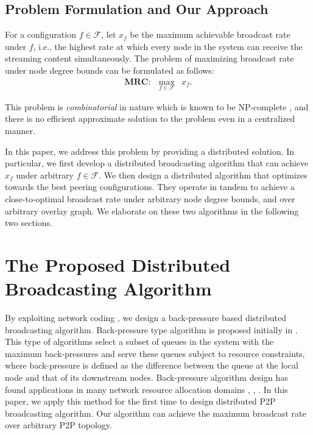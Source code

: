 \documentclass[10pt,conference]{IEEEtran}
\begin{document}
\subsection{Problem Formulation and Our Approach}

For a configuration $f\in\mathcal{F}$, let $x_{f}$
be the maximum achievable broadcast rate under $f$, i.e., the highest rate at which
every node in the system can receive the streaming content simultaneously. The problem of
maximizing broadcast rate under node degree bounds can be
formulated as follows:
\begin{eqnarray}
\mathbf{MRC:} & \max_{f\in\mathcal{F}} & x_{f}.\label{MWC}
\end{eqnarray}

This problem is \emph{combinatorial} in nature which is known to be NP-complete \cite{streaming_capacity.icdcs10},
and there is no efficient approximate solution to the problem even
in a centralized manner.

In this paper, we address this problem by providing a distributed
solution. In particular, we first develop a distributed broadcasting
algorithm that can achieve $x_{f}$ under arbitrary $f\in\mathcal{F}$.
We then design a distributed algorithm that optimizes towards
the best peering configurations. They operate in tandem to achieve
a close-to-optimal broadcast rate under arbitrary node degree bounds,
and over arbitrary overlay graph. We elaborate on these two algorithms
in the following two sections.

\section{The Proposed Distributed Broadcasting Algorithm}

\label{sec:streaming_rate}


By exploiting network coding \cite{all:NetCod:ACLY00}, we design a back-pressure based distributed broadcasting algorithm. Back-pressure type algorithm is proposed initially in \cite{Tassiulas92backpressure}. This type of algorithms select a subset of queues in the system with the maximum back-pressures and serve these queues subject to resource constraints, where back-pressure is defined as the difference between the queue at the local node and that of its downstream nodes. Back-pressure algorithm design has found applications in many network resource allocation domains \cite{all:Backpressure:MAW96}, \cite{all:Backpressure:ESP05}, \cite{all:Backpressure:NMR05}. In this paper, we apply this method for the first time to design distributed P2P broadcasting algorithm. Our algorithm can achieve the maximum broadcast rate over arbitrary P2P topology.
\end{document}
